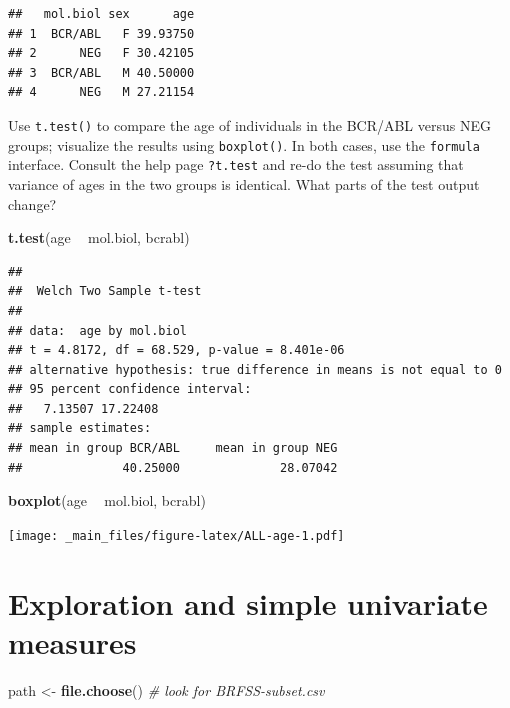 \documentclass[]{article}
\newenvironment{Shaded}{\begin{snugshade}}{\end{snugshade}}
\newcommand{\KeywordTok}[1]{\textcolor[rgb]{0.13,0.29,0.53}{\textbf{#1}}}
\newcommand{\StringTok}[1]{\textcolor[rgb]{0.31,0.60,0.02}{#1}}
\newcommand{\CommentTok}[1]{\textcolor[rgb]{0.56,0.35,0.01}{\textit{#1}}}
\newcommand{\OperatorTok}[1]{\textcolor[rgb]{0.81,0.36,0.00}{\textbf{#1}}}
\newcommand{\NormalTok}[1]{#1}
\theoremstyle{definition}
\theoremstyle{definition}
\theoremstyle{remark}
\begin{document}
\begin{verbatim}
##   mol.biol sex      age
## 1  BCR/ABL   F 39.93750
## 2      NEG   F 30.42105
## 3  BCR/ABL   M 40.50000
## 4      NEG   M 27.21154
\end{verbatim}

Use \texttt{t.test()} to compare the age of individuals in the BCR/ABL
versus NEG groups; visualize the results using \texttt{boxplot()}. In
both cases, use the \texttt{formula} interface. Consult the help page
\texttt{?t.test} and re-do the test assuming that variance of ages in
the two groups is identical. What parts of the test output change?

\begin{Shaded}
\begin{Highlighting}[]
\KeywordTok{t.test}\NormalTok{(age }\OperatorTok{~}\StringTok{ }\NormalTok{mol.biol, bcrabl)}
\end{Highlighting}
\end{Shaded}

\begin{verbatim}
## 
##  Welch Two Sample t-test
## 
## data:  age by mol.biol
## t = 4.8172, df = 68.529, p-value = 8.401e-06
## alternative hypothesis: true difference in means is not equal to 0
## 95 percent confidence interval:
##   7.13507 17.22408
## sample estimates:
## mean in group BCR/ABL     mean in group NEG 
##              40.25000              28.07042
\end{verbatim}

\begin{Shaded}
\begin{Highlighting}[]
\KeywordTok{boxplot}\NormalTok{(age }\OperatorTok{~}\StringTok{ }\NormalTok{mol.biol, bcrabl)}
\end{Highlighting}
\end{Shaded}

\texttt{[image: \_main\_files/figure-latex/ALL-age-1.pdf]}

\section{Exploration and simple univariate
measures}\label{exploration-and-simple-univariate-measures}

\begin{Shaded}
\begin{Highlighting}[]
\NormalTok{path <-}\StringTok{ }\KeywordTok{file.choose}\NormalTok{()    }\CommentTok{# look for BRFSS-subset.csv}
\end{Highlighting}
\end{Shaded}
\end{document}
